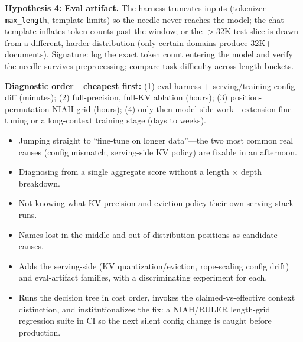 \begin{interviewq}
\textbf{Hypothesis 4: Eval artifact.} The harness truncates inputs (tokenizer \texttt{max\_length}, template limits) so the needle never reaches the model; the chat template inflates token counts past the window; or the $>$32K test slice is drawn from a different, harder distribution (only certain domains produce 32K+ documents). Signature: log the exact token count entering the model and verify the needle survives preprocessing; compare task difficulty across length buckets.

\textbf{Diagnostic order---cheapest first:} (1) eval harness + serving/training config diff (minutes); (2) full-precision, full-KV ablation (hours); (3) position-permutation NIAH grid (hours); (4) only then model-side work---extension fine-tuning or a long-context training stage (days to weeks).

\redflags
\begin{itemize}
    \item Jumping straight to ``fine-tune on longer data''---the two most common real causes (config mismatch, serving-side KV policy) are fixable in an afternoon.
    \item Diagnosing from a single aggregate score without a length $\times$ depth breakdown.
    \item Not knowing what KV precision and eviction policy their own serving stack runs.
\end{itemize}


\goodgreat
\begin{itemize}
    \item {} Names lost-in-the-middle and out-of-distribution positions as candidate causes.
    \item {} Adds the serving-side (KV quantization/eviction, rope-scaling config drift) and eval-artifact families, with a discriminating experiment for each.
    \item {} Runs the decision tree in cost order, invokes the claimed-vs-effective context distinction, and institutionalizes the fix: a NIAH/RULER length-grid regression suite in CI so the next silent config change is caught before production.
\end{itemize}

\end{interviewq}


